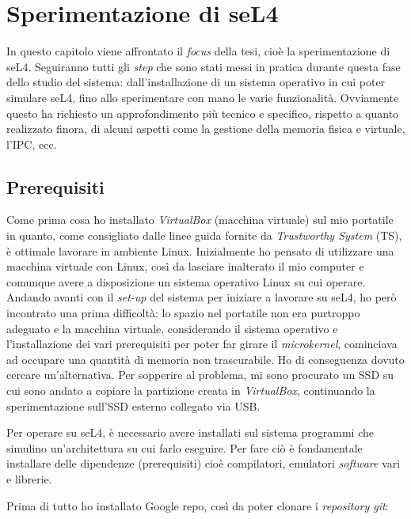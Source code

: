 \chapter{Sperimentazione di seL4}
In questo capitolo viene affrontato il \textit{focus} della tesi, cioè la sperimentazione di seL4. Seguiranno tutti gli \textit{step} che sono stati messi in pratica durante questa fase dello studio del sistema: dall'installazione di un sistema operativo in cui poter simulare seL4, fino allo sperimentare con mano le varie funzionalità. Ovviamente questo ha richiesto un approfondimento più tecnico e specifico, rispetto a quanto realizzato finora, di alcuni aspetti come la gestione della memoria fisica e virtuale, l'IPC, ecc.

\section{Prerequisiti}
Come prima cosa ho installato \textit{VirtualBox} (macchina virtuale) sul mio portatile in quanto, come consigliato dalle linee guida fornite da \textit{Trustworthy System} (TS), è ottimale lavorare in ambiente Linux. Inizialmente ho pensato di utilizzare una macchina virtuale con Linux, così da lasciare inalterato il mio computer e comunque avere a disposizione un sistema operativo Linux su cui operare. Andando avanti con il \textit{set-up} del sistema per iniziare a lavorare su seL4, ho però incontrato una prima difficoltà: lo spazio nel portatile non era purtroppo adeguato e la macchina virtuale, considerando il sistema operativo e l'installazione dei vari prerequisiti per poter far girare il \textit{microkernel}, cominciava ad occupare una quantità di memoria non trascurabile. Ho di conseguenza dovuto cercare un'alternativa. Per sopperire al problema, mi sono procurato un SSD su cui sono andato a copiare la partizione creata in \textit{VirtualBox}, continuando la sperimentazione sull'SSD esterno collegato via USB.

Per operare su seL4, è necessario avere installati sul sistema programmi che simulino un'architettura su cui farlo eseguire. Per fare ciò è fondamentale installare delle dipendenze (prerequisiti) cioè compilatori, emulatori \textit{software} vari e librerie.

Prima di tutto ho installato Google repo, così da poter clonare i \textit{repository git}:

